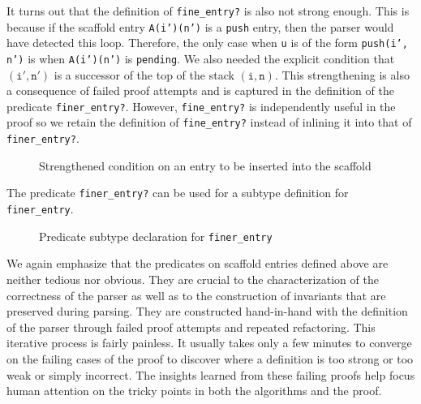 \documentclass[sigplan,10pt,anonymous,review]{acmart}\settopmatter{printfolios=true,printccs=false,printacmref=false}
\begin{document}
\begin{CCSXML}
It turns out that the definition of \texttt{fine\_entry?} is also not
strong enough.  This is because if the scaffold entry
\texttt{A(i')(n')} is a \texttt{push} entry, then the parser would
have detected this loop.  Therefore, the only case when \texttt{u} is
of the form \texttt{push(i', n')} is when \texttt{A(i')(n')} is
\texttt{pending}.  We also needed the explicit condition that
$(\mathtt{i', n'})$ is a successor of the top of the stack $(\mathtt{i,
  n})$\@.  This strengthening is also a consequence of failed proof
attempts and is captured in the definition of the predicate
\texttt{finer\_entry?}\@.  However, \texttt{fine\_entry?} is independently
useful in the proof so we retain the definition of \texttt{fine\_entry?}
instead of inlining it into that of \texttt{finer\_entry?}\@.  

\begin{figure}[h!]
  
    \vspace*{-4mm}
\caption{Strengthened condition on an entry to be inserted into the scaffold}
\label{pvs:finerentry}
\end{figure}

The predicate \texttt{finer\_entry?} can be used for a subtype definition
for \texttt{finer\_entry}\@.
\begin{figure}[h!]
  
    \vspace*{-4mm}
\caption{Predicate subtype declaration for \texttt{finer\_entry}}
\label{pvs:finerentrytype}
\end{figure}



We again emphasize that the predicates on scaffold entries defined
above are neither tedious nor obvious.  They are crucial to the
characterization of the correctness of the parser as well as to the
construction of invariants that are preserved during parsing.  They
are constructed hand-in-hand with the definition of the parser through
failed proof attempts and repeated refactoring.  This iterative
process is fairly painless.  It usually takes only a few minutes to
converge on the failing cases of the proof to discover where a
definition is too strong or too weak or simply incorrect.  The
insights learned from these failing proofs help focus human attention
on the tricky points in both the algorithms and the proof.



\end{CCSXML}
\end{document}
